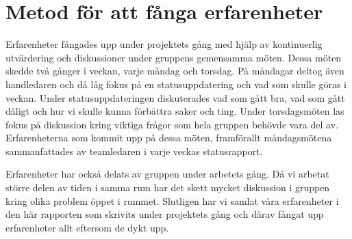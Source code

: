 \section{Metod för att fånga erfarenheter}

Erfarenheter fångades upp under projektets gång med hjälp av kontinuerlig utvärdering och diskussioner under gruppens gemensamma möten. Dessa möten skedde två gånger i veckan, varje måndag och torsdag. På måndagar deltog även handledaren och då låg fokus på en statusuppdatering och vad som skulle göras i veckan. Under statusuppdateringen diskuterades vad som gått bra, vad som gått dåligt och hur vi skulle kunna förbättra saker och ting. Under torsdagsmöten las fokus på diskussion kring viktiga frågor som hela gruppen behövde vara del av. Erfarenheterna som kommit upp på dessa möten, framförallt måndagsmötena sammanfattades av teamledaren i varje veckas statusrapport.

Erfarenheter har också delats av gruppen under arbetets gång. Då vi arbetat större delen av tiden i samma rum har det skett mycket diskussion i gruppen kring olika problem öppet i rummet. Slutligen har vi samlat våra erfarenheter i den här rapporten som skrivits under projektets gång och därav fångat upp erfarenheter allt eftersom de dykt upp.



